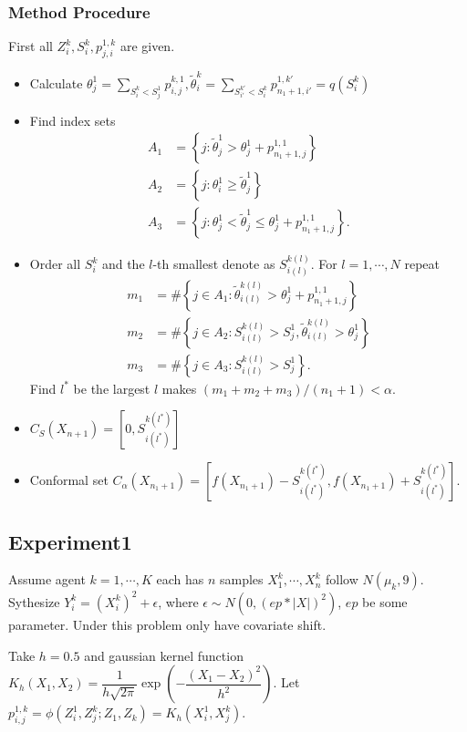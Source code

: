 \documentclass[12pt, a4paper, oneside]{article}
\begin{document}
    \subsubsection{Method Procedure}
    First all $Z_i^k,S_i^k,p_{j,i}^{1,k}$ are given.
    \begin{itemize}
        \item Calculate $\theta_j^1=\overset{}{\underset{S_i^k<S_j^1}\sum}p_{i,j}^{k,1},\tilde{\theta}_i^k=\overset{}{\underset{S_{i'}^{k'}<S_i^k}\sum}p_{n_1+1,i'}^{1,k'}=q(S_i^k)$
        \item Find index sets
        \begin{align*}
            A_1&=\left\{ j:\tilde{\theta}_j^1>\theta_j^1+p_{n_1+1,j}^{1,1} \right\}\\
            A_2&=\left\{ j:\theta_i^1\geq\tilde{\theta}_j^1 \right\}\\
            A_3&=\left\{ j:\theta_j^1<\tilde{\theta}_j^1\leq\theta_j^1+p_{n_1+1,j}^{1,1} \right\}.
        \end{align*}
        \item Order all $S_i^k$ and the $l$-th smallest denote as $S_{i(l)}^{k(l)}$. For $l=1,\cdots,N$ repeat
        \begin{align*}
            m_1&=\#\left\{ j\in A_1:\tilde{\theta}_{i(l)}^{k(l)}>\theta_j^1+p_{n_1+1,j}^{1,1} \right\}\\
            m_2&=\#\left\{ j\in A_2:S_{i(l)}^{k(l)}>S_j^1,\tilde{\theta}_{i(l)}^{k(l)}>\theta_j^1 \right\}\\
            m_3&=\#\left\{ j\in A_3:S_{i(l)}^{k(l)}>S_j^1 \right\}.
        \end{align*}
        Find $l^*$ be the largest $l$ makes $(m_1+m_2+m_3)/(n_1+1)<\alpha$.
        \item $C_S(X_{n+1})=[0,S_{i(l^*)}^{k(l^*)}]$
        \item Conformal set $C_\alpha(X_{n_1+1})=[f(X_{n_1+1})-S_{i(l^*)}^{k(l^*)},f(X_{n_1+1})+S_{i(l^*)}^{k(l^*)}]$.
    \end{itemize}


\subsection{Experiment1}
    Assume agent $k=1,\cdots,K$ each has $n$ samples $X_1^k,\cdots,X_n^k$ follow $N(\mu_k,9)$. Sythesize $Y_i^k=(X_i^k)^2+\epsilon$, where $\epsilon\sim N(0,(ep*|X|)^2)$, $ep$ be some parameter. Under this problem only have covariate shift.


    Take $h=0.5$ and gaussian kernel function $K_h(X_1,X_2)=\dfrac{1}{h\sqrt{2\pi}}\exp\left( -\dfrac{(X_1-X_2)^2}{h^2} \right)$. Let $p_{i,j}^{1,k}=\phi(Z_i^1,Z_j^k;Z_1,Z_k)=K_h(X_i^1,X_j^k)$.
\newpage


\end{document}
